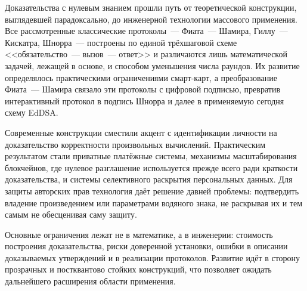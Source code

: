 \documentclass[14pt,a4paper]{extarticle}
\begin{document}

Доказательства с нулевым знанием прошли путь от теоретической конструкции, выглядевшей
парадоксально, до инженерной технологии массового применения. Все рассмотренные
классические протоколы~--- Фиата~--- Шамира, Гиллу~--- Кискатра, Шнорра~--- построены по
единой трёхшаговой схеме <<обязательство~--- вызов~--- ответ>> и различаются лишь
математической задачей, лежащей в основе, и способом уменьшения числа раундов. Их
развитие определялось практическими ограничениями смарт-карт, а преобразование
Фиата~--- Шамира связало эти протоколы с цифровой подписью, превратив интерактивный
протокол в подпись Шнорра и далее в применяемую сегодня схему EdDSA.

Современные конструкции сместили акцент с идентификации личности на доказательство
корректности произвольных вычислений. Практическим результатом стали приватные
платёжные системы, механизмы масштабирования блокчейнов, где нулевое разглашение
используется прежде всего ради краткости доказательства, и системы селективного
раскрытия персональных данных. Для защиты авторских прав технология даёт решение
давней проблемы: подтвердить владение произведением или параметрами водяного знака,
не раскрывая их и тем самым не обесценивая саму защиту.

Основные ограничения лежат не в математике, а в инженерии: стоимость построения
доказательства, риски доверенной установки, ошибки в описании доказываемых утверждений
и в реализации протоколов. Развитие идёт в сторону прозрачных и постквантово стойких
конструкций, что позволяет ожидать дальнейшего расширения области применения.

\end{document}
